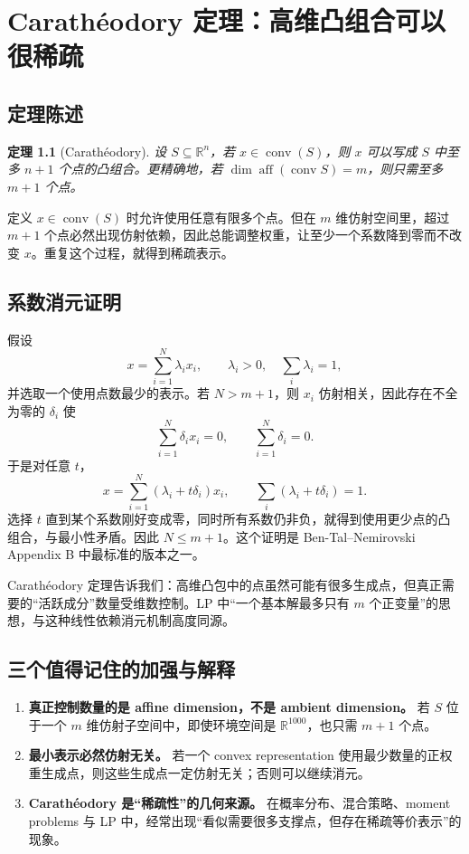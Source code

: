 \documentclass[11pt,a4paper,openany]{ctexrep}
\newtheorem{theorem}{定理}[chapter]
\theoremstyle{definition}
\newcommand{\R}{\mathbb{R}}
\newcommand{\aff}{\operatorname{aff}}
\newcommand{\conv}{\operatorname{conv}}
\begin{document}
\chapter{Carath\'eodory 定理：高维凸组合可以很稀疏}

\section{定理陈述}

\begin{theorem}[Carath\'eodory]
设 $S\subseteq\R^n$，若 $x\in\conv(S)$，则 $x$ 可以写成 $S$ 中至多 $n+1$ 个点的凸组合。更精确地，若 $\dim\aff(\conv S)=m$，则只需至多 $m+1$ 个点。
\end{theorem}

\begin{intuitionbox}[为什么这是一个“降维”定理？]
定义 $x\in\conv(S)$ 时允许使用任意有限多个点。但在 $m$ 维仿射空间里，超过 $m+1$ 个点必然出现仿射依赖，因此总能调整权重，让至少一个系数降到零而不改变 $x$。重复这个过程，就得到稀疏表示。
\end{intuitionbox}

\section{系数消元证明}
假设
\[
x=\sum_{i=1}^N\lambda_i x_i,
\qquad
\lambda_i>0,\quad \sum_i\lambda_i=1,
\]
并选取一个使用点数最少的表示。若 $N>m+1$，则 $x_i$ 仿射相关，因此存在不全为零的 $\delta_i$ 使
\[
\sum_{i=1}^N\delta_i x_i=0,
\qquad
\sum_{i=1}^N\delta_i=0.
\]
于是对任意 $t$，
\[
x=\sum_{i=1}^N(\lambda_i+t\delta_i)x_i,
\qquad
\sum_i(\lambda_i+t\delta_i)=1.
\]
选择 $t$ 直到某个系数刚好变成零，同时所有系数仍非负，就得到使用更少点的凸组合，与最小性矛盾。因此 $N\le m+1$。这个证明是 Ben-Tal--Nemirovski Appendix B 中最标准的版本之一。\cite[Appendix~B.2.1]{bental}

\begin{keybox}[在 OR/LP 中的意义]
Carath\'eodory 定理告诉我们：高维凸包中的点虽然可能有很多生成点，但真正需要的“活跃成分”数量受维数控制。LP 中“一个基本解最多只有 $m$ 个正变量”的思想，与这种线性依赖消元机制高度同源。
\end{keybox}


\section{三个值得记住的加强与解释}
\begin{enumerate}[leftmargin=2.2em]
  \item \textbf{真正控制数量的是 affine dimension，不是 ambient dimension。} 若 $S$ 位于一个 $m$ 维仿射子空间中，即使环境空间是 $\R^{1000}$，也只需 $m+1$ 个点。
  \item \textbf{最小表示必然仿射无关。} 若一个 convex representation 使用最少数量的正权重生成点，则这些生成点一定仿射无关；否则可以继续消元。
  \item \textbf{Carath\'eodory 是“稀疏性”的几何来源。} 在概率分布、混合策略、moment problems 与 LP 中，经常出现“看似需要很多支撑点，但存在稀疏等价表示”的现象。
\end{enumerate}
\end{document}

